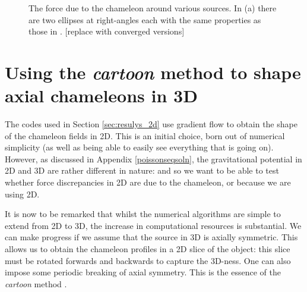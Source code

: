 \documentclass[a4paper, 12pt]{article}
\numberwithin{equation}{section}
\newcommand{\note}[1]{{\color{blue}[#1]}}
\begin{document}
\begin{figure}[!t]
      \begin{center}
      \end{center}
\caption{ The force due to the chameleon around various sources. In (a) there are two ellipses at right-angles each with the same properties as those in .  \note{replace with converged versions}}\label{fig:varioushapes}
\end{figure}

\section{Using the \textit{cartoon} method to shape axial chameleons in 3D}
The codes used in Section \ref{sec:resulys_2d} use gradient flow to obtain the shape of the chameleon fields in 2D. This is an initial choice, born out of numerical simplicity (as well as being able to easily see everything that is going on). However, as discussed in Appendix \ref{poissonseqsoln}, the gravitational potential in 2D and 3D are rather different in nature: and so we want to be able to test whether force discrepancies in 2D are due to the chameleon, or because we are using 2D. 

It is now to be remarked that whilst the numerical algorithms are simple to extend from 2D to 3D, the increase in computational resources is substantial. We can make progress if we assume that the source in 3D is axially symmetric. This allows us to obtain the chameleon profiles in a 2D slice of the object: this slice must be rotated forwards and backwards to capture the 3D-ness. One can also impose some periodic breaking of axial symmetry. This is the essence of the \textit{cartoon} method \cite{Alcubierre:1999ab}. 
\end{document}
